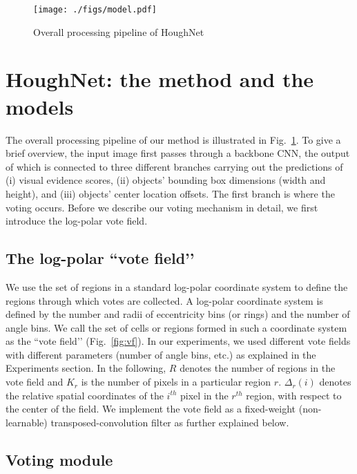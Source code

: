 \documentclass[runningheads]{llncs}
\begin{document}
\setlength\intextsep{8mm}
 \begin{figure}[t]
\texttt{[image: ./figs/model.pdf]}
\caption{Overall processing pipeline of HoughNet}
\label{fig:model}
\end{figure}
\section{HoughNet: the method and the models}




The overall processing pipeline of our method is illustrated in Fig.~\ref{fig:model}. To give a brief overview, the input image first passes through a backbone CNN, the output of which is connected to three different branches carrying out the predictions of (i) visual evidence scores, (ii) objects’ bounding box dimensions (width and height), and (iii) objects’ center location offsets. The first branch is where the voting occurs. Before we describe our voting mechanism in detail, we first introduce the log-polar vote field. 




\subsection{The log-polar ``vote field’’}




We use the set of regions in a  standard log-polar coordinate system to define the regions through which votes are collected. A log-polar coordinate system is defined by the number and radii of eccentricity bins (or rings) and the number of angle bins. We call the set of cells or regions formed in such a coordinate system as the ``vote field’’ (Fig.~\ref{fig:vf}). In our experiments, we used  different vote fields with different parameters (number of angle bins, etc.) as explained in the Experiments section. In the following, $R$ denotes the number of regions in the vote field and $K_r$ is the number of pixels in a particular region $r$. $\Delta_r(i)$ denotes the relative spatial coordinates of the $i^{th}$ pixel in the $r^{th}$ region, with respect to the center of the field. We implement the vote field as a fixed-weight (non-learnable) transposed-convolution filter as further explained below. 




\subsection{Voting module}
\end{document}
